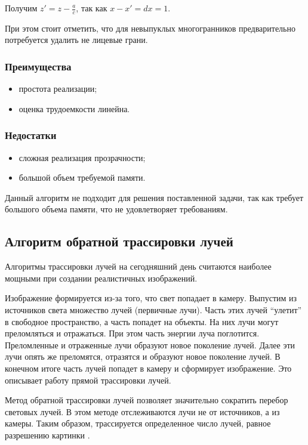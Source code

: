 Получим $z' = z - \frac{a}{c}$, так как $x - x' = dx = 1$.

При этом стоит отметить, что для невыпуклых многогранников предварительно потребуется удалить не лицевые грани.

\subsubsection*{Преимущества}
\begin{itemize}
	\item простота реализации;
	\item оценка трудоемкости линейна.
\end{itemize}
\subsubsection*{Недостатки}
\begin{itemize}
	\item сложная реализация прозрачности;
	\item большой объем требуемой памяти.
\end{itemize}

Данный алгоритм не подходит для решения поставленной задачи, так как требует большого объема памяти, что не удовлетворяет требованиям. 

\subsection{Алгоритм обратной трассировки лучей}
Алгоритмы трассировки лучей на сегодняшний день считаются наиболее мощными при создании реалистичных изображений. 

Изображение формируется из-за того, что свет попадает в камеру. Выпустим из источников света множество лучей (первичные лучи). Часть этих лучей “улетит” в свободное пространство, а часть попадет на объекты. На них лучи могут преломляться и отражаться. При этом часть энергии луча поглотится. Преломленные и отраженные лучи образуют новое поколение лучей. Далее эти лучи опять же преломятся, отразятся и образуют новое поколение лучей. В конечном итоге часть лучей попадет в камеру и сформирует изображение. Это описывает работу прямой трассировки лучей.

Метод обратной трассировки лучей позволяет значительно сократить перебор световых лучей. В этом методе отслеживаются лучи не от источников, а из камеры. Таким образом, трассируется определенное число лучей, равное разрешению картинки \cite{raytrace}.

